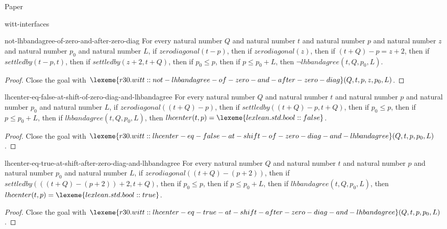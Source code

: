 \begin{lexlean}{Paper}
\begin{section}{witt-interfaces}
  \begin{theorem}{not-lhbandagree-of-zero-and-after-zero-diag}
  For every natural number \(Q\) and natural number \(t\) and natural number \(p\) and natural number \(z\) and natural number \(p_0\) and natural number \(L\), if \(zerodiagonal(t - p)\), then if \(zerodiagonal(z)\), then if \((t + Q) - p = z + 2\), then if \(settledby(t - p, t)\), then if \(settledby(z + 2, t + Q)\), then if \(p_0 ≤ p\), then if \(p ≤ p_0 + L\), then \(¬ lhbandagree(t, Q, p_0, L)\).
  \begin{proof}
  Close the goal with \(\lexeme{r30.witt::not-lhbandagree-of-zero-and-after-zero-diag}(Q, t, p, z, p_0, L)\).
  \end{proof}
  \end{theorem}

  \begin{theorem}{lhcenter-eq-false-at-shift-of-zero-diag-and-lhbandagree}
  For every natural number \(Q\) and natural number \(t\) and natural number \(p\) and natural number \(p_0\) and natural number \(L\), if \(zerodiagonal((t + Q) - p)\), then if \(settledby((t + Q) - p, t + Q)\), then if \(p_0 ≤ p\), then if \(p ≤ p_0 + L\), then if \(lhbandagree(t, Q, p_0, L)\), then \(lhcenter(t, p) = \lexeme{lexlean.std.bool::false}\).
  \begin{proof}
  Close the goal with \(\lexeme{r30.witt::lhcenter-eq-false-at-shift-of-zero-diag-and-lhbandagree}(Q, t, p, p_0, L)\).
  \end{proof}
  \end{theorem}

  \begin{theorem}{lhcenter-eq-true-at-shift-after-zero-diag-and-lhbandagree}
  For every natural number \(Q\) and natural number \(t\) and natural number \(p\) and natural number \(p_0\) and natural number \(L\), if \(zerodiagonal((t + Q) - (p + 2))\), then if \(settledby(((t + Q) - (p + 2)) + 2, t + Q)\), then if \(p_0 ≤ p\), then if \(p ≤ p_0 + L\), then if \(lhbandagree(t, Q, p_0, L)\), then \(lhcenter(t, p) = \lexeme{lexlean.std.bool::true}\).
  \begin{proof}
  Close the goal with \(\lexeme{r30.witt::lhcenter-eq-true-at-shift-after-zero-diag-and-lhbandagree}(Q, t, p, p_0, L)\).
  \end{proof}
  \end{theorem}


\end{section}
\end{lexlean}
